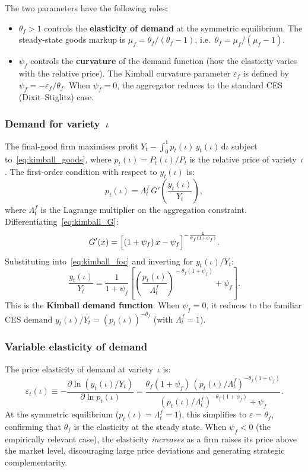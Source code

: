 \documentclass[11pt,a4paper]{article}
\newcommand{\dd}{\mathrm{d}}
\begin{document}
The two parameters have the following roles:
\begin{itemize}[nosep]
  \item $\theta_f > 1$ controls the \textbf{elasticity of demand} at the
    symmetric equilibrium. The steady-state goods markup is
    $\mu_f = \theta_f/(\theta_f-1)$, i.e.\
    $\theta_f = \mu_f/(\mu_f - 1)$.
  \item $\psi_f$ controls the \textbf{curvature} of the demand function
    (how the elasticity varies with the relative price). The Kimball
    curvature parameter $\varepsilon_f$ is defined by
    $\psi_f = -\varepsilon_f/\theta_f$.
    When $\psi_f = 0$, the aggregator reduces to the standard CES
    (Dixit--Stiglitz) case.
\end{itemize}

\subsubsection{Demand for variety~$\iota$}

The final-good firm maximises profit
$Y_t - \int_0^1 p_t(\iota)\,y_t(\iota)\,\dd\iota$ subject
to~\eqref{eq:kimball_goods}, where $p_t(\iota) = P_t(\iota)/P_t$ is the
relative price of variety~$\iota$. The first-order condition with respect to
$y_t(\iota)$ is:
\begin{equation}\label{eq:kimball_foc}
  p_t(\iota) = \Lambda^f_t\,G'\!\left(\frac{y_t(\iota)}{Y_t}\right),
\end{equation}
where $\Lambda^f_t$ is the Lagrange multiplier on the aggregation
constraint. Differentiating~\eqref{eq:kimball_G}:
\[
  G'(x) = \Bigl[(1+\psi_f)\,x - \psi_f\Bigr]^{-\frac{1}{\theta_f(1+\psi_f)}}.
\]
Substituting into~\eqref{eq:kimball_foc} and inverting for $y_t(\iota)/Y_t$:
\begin{equation}\label{eq:kimball_demand}
  \frac{y_t(\iota)}{Y_t}
  = \frac{1}{1+\psi_f}\left[
    \left(\frac{p_t(\iota)}{\Lambda^f_t}\right)^{\!-\theta_f(1+\psi_f)}
    + \psi_f\right].
\end{equation}
This is the \textbf{Kimball demand function}. When $\psi_f = 0$, it
reduces to the familiar CES demand $y_t(\iota)/Y_t =
(p_t(\iota))^{-\theta_f}$ (with $\Lambda^f_t = 1$).

\subsubsection{Variable elasticity of demand}

The price elasticity of demand at variety~$\iota$ is:
\[
  \varepsilon_t(\iota)
  \equiv -\frac{\partial\ln(y_t(\iota)/Y_t)}{\partial\ln p_t(\iota)}
  = \frac{\theta_f(1+\psi_f)\,
    (p_t(\iota)/\Lambda^f_t)^{-\theta_f(1+\psi_f)}}
    {(p_t(\iota)/\Lambda^f_t)^{-\theta_f(1+\psi_f)} + \psi_f}.
\]
At the symmetric equilibrium ($p_t(\iota) = \Lambda^f_t = 1$), this
simplifies to $\varepsilon = \theta_f$, confirming that $\theta_f$ is
the elasticity at the steady state. When $\psi_f < 0$ (the empirically
relevant case), the elasticity \emph{increases} as a firm raises its
price above the market level, discouraging large price deviations and
generating strategic complementarity.
\end{document}
